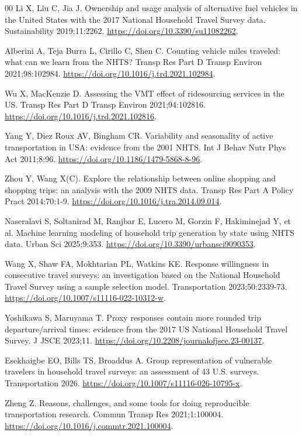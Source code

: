 \documentclass[preprint,12pt, a4paper]{elsarticle}
\begin{document}
\begin{thebibliography}{00}
 Li X, Liu C, Jia J. Ownership and usage analysis of alternative fuel vehicles in the United States with the 2017 National Household Travel Survey data. Sustainability 2019;11:2262. \url{https://doi.org/10.3390/su11082262}.

 Alberini A, Teja Burra L, Cirillo C, Shen C. Counting vehicle miles traveled: what can we learn from the NHTS? Transp Res Part D Transp Environ 2021;98:102984. \url{https://doi.org/10.1016/j.trd.2021.102984}.

 Wu X, MacKenzie D. Assessing the VMT effect of ridesourcing services in the US. Transp Res Part D Transp Environ 2021;94:102816. \url{https://doi.org/10.1016/j.trd.2021.102816}.

 Yang Y, Diez Roux AV, Bingham CR. Variability and seasonality of active transportation in USA: evidence from the 2001 NHTS. Int J Behav Nutr Phys Act 2011;8:96. \url{https://doi.org/10.1186/1479-5868-8-96}.

 Zhou Y, Wang X(C). Explore the relationship between online shopping and shopping trips: an analysis with the 2009 NHTS data. Transp Res Part A Policy Pract 2014;70:1-9. \url{https://doi.org/10.1016/j.tra.2014.09.014}.

 Naseralavi S, Soltanirad M, Ranjbar E, Lucero M, Gorzin F, Hakiminejad Y, et al. Machine learning modeling of household trip generation by state using NHTS data. Urban Sci 2025;9:353. \url{https://doi.org/10.3390/urbansci9090353}.

 Wang X, Shaw FA, Mokhtarian PL, Watkins KE. Response willingness in consecutive travel surveys: an investigation based on the National Household Travel Survey using a sample selection model. Transportation 2023;50:2339-73. \url{https://doi.org/10.1007/s11116-022-10312-w}.

 Yoshikawa S, Maruyama T. Proxy responses contain more rounded trip departure/arrival times: evidence from the 2017 US National Household Travel Survey. J JSCE 2023;11. \url{https://doi.org/10.2208/journalofjsce.23-00137}.

 Esekhaigbe EO, Bills TS, Broaddus A. Group representation of vulnerable travelers in household travel surveys: an assessment of 43 U.S. surveys. Transportation 2026. \url{https://doi.org/10.1007/s11116-026-10795-x}.

 Zheng Z. Reasons, challenges, and some tools for doing reproducible transportation research. Commun Transp Res 2021;1:100004. \url{https://doi.org/10.1016/j.commtr.2021.100004}.


\end{thebibliography}
\end{document}
